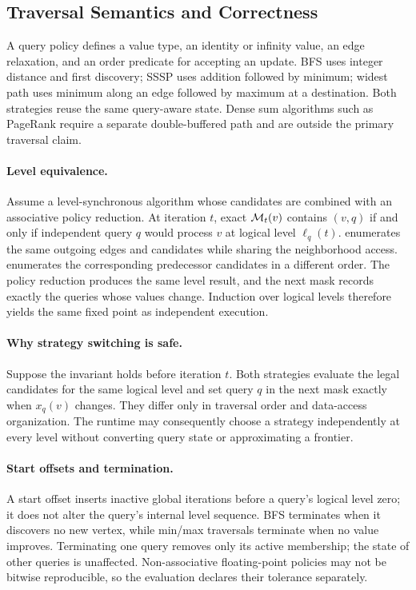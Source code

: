 \subsection{Traversal Semantics and Correctness}

A query policy defines a value type, an identity or infinity value, an edge relaxation, and an order predicate for accepting an update.  BFS uses integer distance and first discovery; SSSP uses addition followed by minimum; widest path uses minimum along an edge followed by maximum at a destination.  Both strategies reuse the same query-aware state.  Dense sum algorithms such as PageRank require a separate double-buffered path and are outside the primary traversal claim.

\paragraph{Level equivalence.}
Assume a level-synchronous algorithm whose candidates are combined with an associative policy reduction.  At iteration $t$, exact $\mathcal{M}_t(v)$ contains $(v,q)$ if and only if independent query $q$ would process $v$ at logical level $\ell_q(t)$.  \sharedexpand enumerates the same outgoing edges and candidates while sharing the neighborhood access.  \coalescedgather enumerates the corresponding predecessor candidates in a different order.  The policy reduction produces the same level result, and the next mask records exactly the queries whose values change.  Induction over logical levels therefore yields the same fixed point as independent execution.

\paragraph{Why strategy switching is safe.}
Suppose the invariant holds before iteration $t$.  Both strategies evaluate the legal candidates for the same logical level and set query $q$ in the next mask exactly when $x_q(v)$ changes.  They differ only in traversal order and data-access organization.  The runtime may consequently choose a strategy independently at every level without converting query state or approximating a frontier.

\paragraph{Start offsets and termination.}
A start offset inserts inactive global iterations before a query's logical level zero; it does not alter the query's internal level sequence.  BFS terminates when it discovers no new vertex, while min/max traversals terminate when no value improves.  Terminating one query removes only its active membership; the state of other queries is unaffected.  Non-associative floating-point policies may not be bitwise reproducible, so the evaluation declares their tolerance separately.

